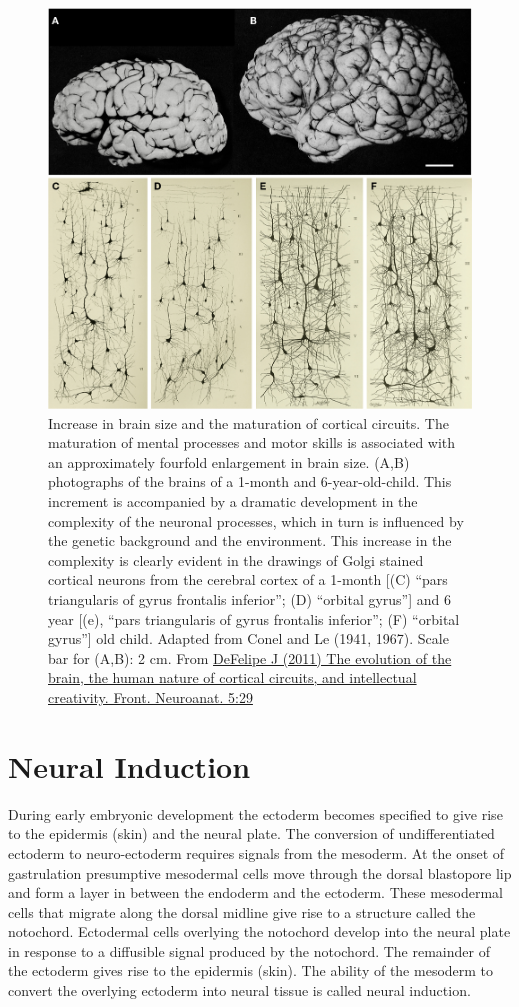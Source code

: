 \begin{figure}

{\centering \includegraphics[width=0.7\linewidth]{./figures/development/fnana-05-00029-g004} 

}

\caption{Increase in brain size and the maturation of cortical circuits. The maturation of mental processes and motor skills is associated with an approximately fourfold enlargement in brain size. (A,B) photographs of the brains of a 1-month and 6-year-old-child. This increment is accompanied by a dramatic development in the complexity of the neuronal processes, which in turn is influenced by the genetic background and the environment. This increase in the complexity is clearly evident in the drawings of Golgi stained cortical neurons from the cerebral cortex of a 1-month {[}(C) ``pars triangularis of gyrus frontalis inferior''; (D) ``orbital gyrus''{]} and 6 year {[}(e), ``pars triangularis of gyrus frontalis inferior''; (F) ``orbital gyrus''{]} old child. Adapted from Conel and Le (1941, 1967). Scale bar for (A,B): 2 cm. From \href{https://www.frontiersin.org/article/10.3389/fnana.2011.00029}{DeFelipe J (2011) The evolution of the brain, the human nature of cortical circuits, and intellectual creativity. Front. Neuroanat. 5:29}}\label{fig:brainsize}
\end{figure}

\hypertarget{neural-induction}{%
\section{Neural Induction}\label{neural-induction}}

During early embryonic development the ectoderm becomes specified to give rise to the epidermis (skin) and the neural plate. The conversion of undifferentiated ectoderm to neuro-ectoderm requires signals from the mesoderm. At the onset of gastrulation presumptive mesodermal cells move through the dorsal blastopore lip and form a layer in between the endoderm and the ectoderm. These mesodermal cells that migrate along the dorsal midline give rise to a structure called the notochord. Ectodermal cells overlying the notochord develop into the neural plate in response to a diffusible signal produced by the notochord. The remainder of the ectoderm gives rise to the epidermis (skin). The ability of the mesoderm to convert the overlying ectoderm into neural tissue is called neural induction.

